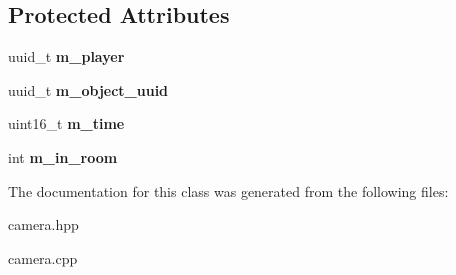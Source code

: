 \subsection*{Protected Attributes}
\begin{DoxyCompactItemize}
\item 
\mbox{\label{classmods_1_1camera_a90a3f5554c9bbfbf118526c53bab87e8}} 
uuid\+\_\+t {\bfseries m\+\_\+player}
\item 
\mbox{\label{classmods_1_1camera_abebf34fd5baeb3f97e7755cef9eef28e}} 
uuid\+\_\+t {\bfseries m\+\_\+object\+\_\+uuid}
\item 
\mbox{\label{classmods_1_1camera_a7e04e7d15da3ef4975504ba7e270679a}} 
uint16\+\_\+t {\bfseries m\+\_\+time}
\item 
\mbox{\label{classmods_1_1camera_a3234c34292c6fafb86d189b33f2952ed}} 
int {\bfseries m\+\_\+in\+\_\+room}
\end{DoxyCompactItemize}


The documentation for this class was generated from the following files\+:\begin{DoxyCompactItemize}
\item 
camera.\+hpp\item 
camera.\+cpp\end{DoxyCompactItemize}
